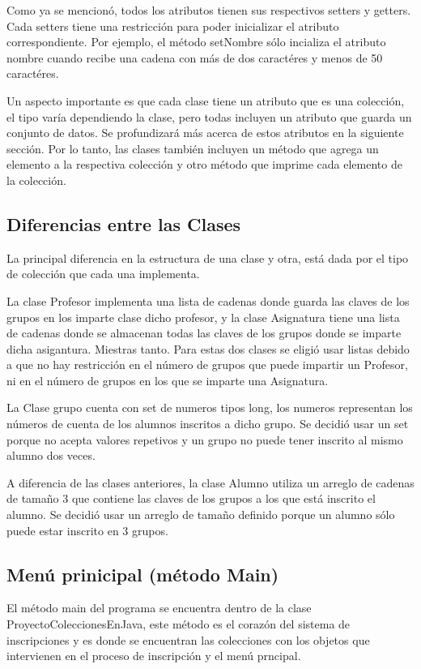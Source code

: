 \documentclass[12pt, letterpaper]{report}
\begin{document}
Como ya se mencionó, todos los atributos tienen sus respectivos setters y getters. Cada setters tiene una restricción para poder inicializar el atributo correspondiente. Por ejemplo, el método setNombre sólo incializa el atributo nombre cuando recibe una cadena con más de dos caractéres y menos de 50 caractéres.

Un aspecto importante es que cada clase tiene un atributo que es una colección, el tipo varía dependiendo la clase, pero todas incluyen un atributo que guarda un conjunto de datos. Se profundizará más acerca de estos atributos en la siguiente sección. Por lo tanto, las clases también incluyen un método que agrega un elemento a la respectiva colección y otro método que imprime cada elemento de la colección. 

\subsection*{Diferencias entre las Clases}
La principal diferencia en la estructura de una clase y otra, está dada por el tipo de colección que cada una implementa. 

La clase Profesor implementa una lista de cadenas donde guarda las claves de los grupos en los imparte clase dicho profesor, y la clase Asignatura tiene una lista de cadenas donde se almacenan todas las claves de los grupos donde se imparte dicha asigantura. Miestras tanto. Para estas dos clases se eligió usar listas debido a que no hay restricción en el número de grupos que puede impartir un Profesor, ni en el número de grupos en los que se imparte una Asignatura. 

La Clase grupo cuenta con set de numeros tipos long, los numeros representan los números de cuenta de los alumnos inscritos a dicho grupo. Se decidió usar un set porque no acepta valores repetivos y un grupo no puede tener inscrito al mismo alumno dos veces. 

A diferencia de las clases anteriores, la clase Alumno utiliza un arreglo de cadenas de tamaño 3 que contiene las claves de los grupos a los que está inscrito el alumno. Se decidió usar un arreglo de tamaño definido porque un alumno sólo puede estar inscrito en 3 grupos. 

\subsection*{Menú prinicipal (método Main)}
El método main del programa se encuentra dentro de la clase ProyectoColeccionesEnJava, este método es el corazón del sistema de inscripciones y es donde se encuentran las colecciones con los objetos que intervienen en el proceso de inscripción y el menú prncipal. 
\end{document}
